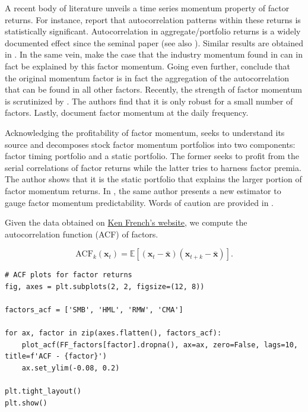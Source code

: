 A recent body of literature unveils a time series momentum property of factor returns. For instance, \cite{gupta2019factor} report that autocorrelation patterns within these returns is statistically significant. Autocorrelation in aggregate/portfolio returns is a widely documented effect since the seminal paper \cite{lo1990contrarian} (see also \cite{moskowitz2012time}). Similar results are obtained in \cite{falck2020factor}. In the same vein, \cite{arnott2019factor} make the case that the industry momentum found in \cite{moskowitz1999industries} can in fact be explained by this factor momentum. Going even further, \cite{ehsani2019factor} conclude that the original momentum factor is in fact the aggregation of the autocorrelation that can be found in all other factors. Recently, the strength of factor momentum is scrutinized by \cite{fan2021reexamination}. The authors find that it is only robust for a small number of factors. Lastly, \cite{garcia2021factor} document factor momentum at the daily frequency.

Acknowledging the profitability of factor momentum, \cite{yang2020decomposing} seeks to understand its source and decomposes stock factor momentum portfolios into two components: factor timing portfolio and a static portfolio. The former seeks to profit from the serial correlations of factor returns while the latter tries to harness factor premia. The author shows that it is the static portfolio that explains the larger portion of factor momentum returns. In \cite{yang2020weighted}, the same author presents a new estimator to gauge factor momentum predictability. Words of caution are provided in \cite{leippold2021anatomy}.

Given the data obtained on \href{https://mba.tuck.dartmouth.edu/pages/faculty/ken.french/data\_library.html}{Ken French's website}, we compute the autocorrelation function (ACF) of factors.

\begin{equation}
\label{acf}
\text{ACF}_k(\textbf{x}_t)=\mathbb{E}[(\textbf{x}_t-\bar{\textbf{x}})(\textbf{x}_{t+k}-\bar{\textbf{x}})].
\end{equation}

\begin{verbatim}
# ACF plots for factor returns
fig, axes = plt.subplots(2, 2, figsize=(12, 8))

factors_acf = ['SMB', 'HML', 'RMW', 'CMA']

for ax, factor in zip(axes.flatten(), factors_acf):
    plot_acf(FF_factors[factor].dropna(), ax=ax, zero=False, lags=10, title=f'ACF - {factor}')
    ax.set_ylim(-0.08, 0.2)

plt.tight_layout()
plt.show()
\end{verbatim}

